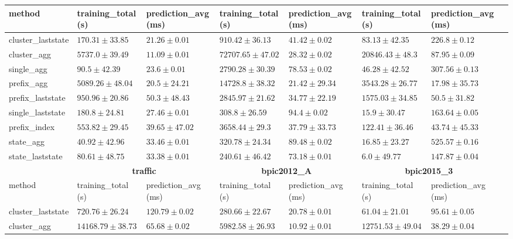 \documentclass[twoside,11pt]{Latex/Classes/PhDthesisPSnPDF}
\begin{document}
\begin{table}[h]
{\begin{tabular}{llllllll}
				method  & training\_total (s) & prediction\_avg (ms) & training\_total (s) & prediction\_avg (ms) & training\_total (s) & prediction\_avg (ms) \\ \midrule
				cluster\_laststate & $170.31 \pm 33.85$ & $21.26 \pm 0.01$ & $910.42 \pm 36.13$ & $41.42 \pm 0.02$ & $83.13 \pm 42.35$ & $226.8 \pm 0.12$ \\ 
				cluster\_agg & $5737.0 \pm 39.49$ & $\mathbf{11.09 \pm 0.01}$ & $72707.65 \pm 47.02$ & $28.32 \pm 0.02$ & $20846.43 \pm 48.3$ & $87.95 \pm 0.09$ \\ 
				single\_agg & $90.5 \pm 42.39$ & $23.6 \pm 0.01$ & $2790.28 \pm 30.39$ & $78.53 \pm 0.02$ & $46.28 \pm 42.52$ & $307.56 \pm 0.13$ \\ 
				prefix\_agg & $5089.26 \pm 48.04$ & $20.5 \pm 24.21$ & $14728.8 \pm 38.32$ & $\mathbf{21.42 \pm 29.34}$ & $3543.28 \pm 26.77$ & $\mathbf{17.98 \pm 35.73}$ \\ 
				prefix\_laststate & $950.96 \pm 20.86$ & $50.3 \pm 48.43$ & $2845.97 \pm 21.62$ & $34.77 \pm 22.19$ & $1575.03 \pm 34.85$ & $50.5 \pm 31.82$ \\ 
				single\_laststate & $180.8 \pm 24.81$ & $27.46 \pm 0.01$ & $308.8 \pm 26.59$ & $94.4 \pm 0.02$ & $15.9 \pm 30.47$ & $163.64 \pm 0.05$ \\ 
				prefix\_index & $553.82 \pm 29.45$ & $39.65 \pm 47.02$ & $3658.44 \pm 29.3$ & $37.79 \pm 33.73$ & $122.41 \pm 36.46$ & $43.74 \pm 45.33$ \\ 
				state\_agg & $\mathbf{40.92 \pm 42.96}$ & $33.46 \pm 0.01$ & $320.78 \pm 24.34$ & $89.48 \pm 0.02$ & $16.85 \pm 23.27$ & $525.57 \pm 0.16$ \\ 
				state\_laststate & $80.61 \pm 48.75$ & $33.38 \pm 0.01$ & $\mathbf{240.61 \pm 46.42}$ & $73.18 \pm 0.01$ & $\mathbf{6.0 \pm 49.77}$ & $147.87 \pm 0.04$ \\ 
				\bottomrule
				\toprule
				& \multicolumn{2}{c}{{\bfseries traffic}} & \multicolumn{2}{c}{{\bfseries bpic2012\_A}} & \multicolumn{2}{c}{{\bfseries bpic2015\_3}} \\ \cmidrule(lr){2-3} \cmidrule(lr){4-5} \cmidrule(lr){6-7}
				method  & training\_total (s) & prediction\_avg (ms) & training\_total (s) & prediction\_avg (ms) & training\_total (s) & prediction\_avg (ms) \\ \midrule
				cluster\_laststate & $720.76 \pm 26.24$ & $120.79 \pm 0.02$ & $280.66 \pm 22.67$ & $20.78 \pm 0.01$ & $61.04 \pm 21.01$ & $95.61 \pm 0.05$ \\ 
				cluster\_agg & $14168.79 \pm 38.73$ & $65.68 \pm 0.02$ & $5982.58 \pm 26.93$ & $\mathbf{10.92 \pm 0.01}$ & $12751.53 \pm 49.04$ & $38.29 \pm 0.04$ \\ 

\end{tabular}}
\end{table}
\end{document}

